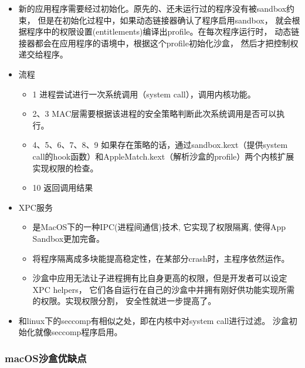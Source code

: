\documentclass[AutoFakeBold,a4paper]{ctexart}
\begin{document}
\begin{itemize}
    \item 新的应用程序需要经过初始化。原先的、还未运行过的程序没有被sandbox约束，
    但是在初始化过程中，如果动态链接器确认了程序启用sandbox，
    就会根据程序中的权限设置(entitlements)编译出profile。在每次程序运行时，
    动态链接器都会在应用程序的语境中，根据这个profile初始化沙盒，
    然后才把控制权递交给程序。
    \item 流程
    \begin{itemize}
        \item 1 进程尝试进行一次系统调用（system call），调用内核功能。
        \item 2、3 MAC层需要根据该进程的安全策略判断此次系统调用是否可以执行。
        \item 4、5、6、7、8、9 如果存在策略的话，通过sandbox.kext（提供system call的hook函数）和AppleMatch.kext（解析沙盒的profile）两个内核扩展实现权限的检查。
        \item 10 返回调用结果
    \end{itemize}
    \item XPC服务
    \begin{itemize}
        \item 是MacOS下的一种IPC(进程间通信)技术, 它实现了权限隔离, 
        使得App Sandbox更加完备。
        \item 将程序隔离成多块能提高稳定性，在某部分crash时，主程序依然运作。
        \item 沙盒中应用无法让子进程拥有比自身更高的权限，但是开发者可以设定XPC helpers，
        它们各自运行在自己的沙盒中并拥有刚好供功能实现所需的权限。实现权限分割，
        安全性就进一步提高了。
    \end{itemize}
    \item 和linux下的seccomp有相似之处，即在内核中对system call进行过滤。
    沙盒初始化就像seccomp程序启用。
\end{itemize}

\subsubsection{macOS沙盒优缺点}
\end{document}
